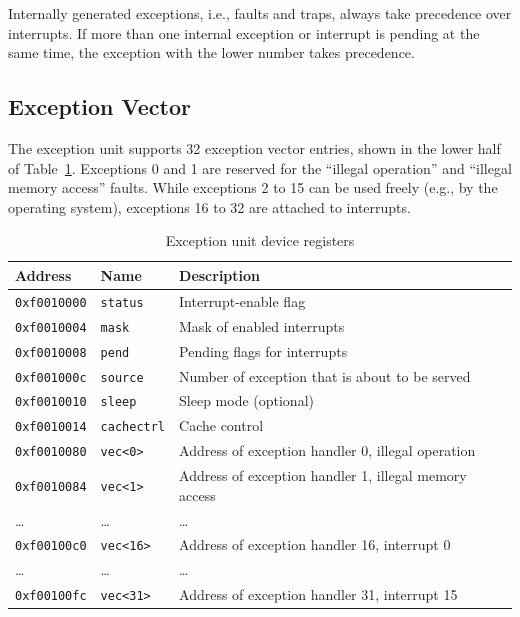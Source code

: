 \documentclass[a4paper,fontsize=10pt,twoside,DIV15,BCOR12mm,headinclude=true,footinclude=false,pagesize,bibtotoc]{scrbook}
\begin{document}
Internally generated exceptions, i.e., faults and traps, always take
precedence over interrupts. If more than one internal exception or
interrupt is pending at the same time, the exception with the lower
number takes precedence.

\subsection{Exception Vector}

The exception unit supports 32 exception vector entries, shown in the
lower half of Table~\ref{tab:excioregs}. Exceptions 0
and 1 are reserved for the ``illegal operation'' and ``illegal memory
access'' faults. While exceptions 2 to 15 can be used freely (e.g., by
the operating system), exceptions 16 to 32 are attached to interrupts.

\begin{table}[b]
  \centering
  \begin{tabular}{llp{}}
    \toprule
    Address             & Name             & Description \\
    \midrule
    \texttt{0xf0010000} & \texttt{status} & Interrupt-enable flag \\
    \texttt{0xf0010004} & \texttt{mask} & Mask of enabled interrupts \\
    \texttt{0xf0010008} & \texttt{pend} & Pending flags for interrupts \\
    \texttt{0xf001000c} & \texttt{source} & Number of exception that
    is about to be served \\
    \texttt{0xf0010010} & \texttt{sleep} & Sleep mode (optional) \\
    \texttt{0xf0010014} & \texttt{cachectrl} & Cache control \\
    \cmidrule{1-3}
    \texttt{0xf0010080} & \texttt{vec<0>} & Address of exception handler 0, illegal operation \\
    \texttt{0xf0010084} & \texttt{vec<1>} & Address of exception handler 1, illegal memory access \\
    \dots & \dots & \dots \\
    \cmidrule{1-3}
    \texttt{0xf00100c0} & \texttt{vec<16>} & Address of exception handler 16, interrupt 0 \\
    \dots & \dots & \dots \\
    \texttt{0xf00100fc} & \texttt{vec<31>} & Address of exception handler 31, interrupt 15 \\
    \bottomrule
  \end{tabular}
  \caption{Exception unit device registers}
  \label{tab:excioregs}
\end{table}
\end{document}
